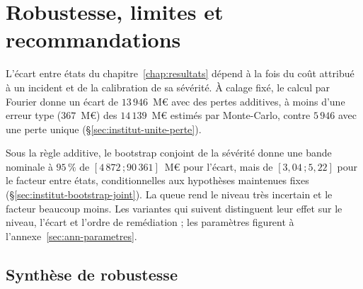 ﻿%

\chapter{Robustesse, limites et recommandations}
\label{ch:robustesse}
\label{part:limites}

L'écart entre états du chapitre~\ref{chap:resultats} dépend à la fois du coût attribué à un incident
et de la calibration de sa sévérité. À calage fixé, le calcul par Fourier donne un écart de
$13\,946$~M\euro{} avec des pertes additives, à moins d'une erreur type ($367$~M\euro) des
$14\,139$~M\euro{} estimés par Monte-Carlo, contre $5\,946$ avec une perte unique
(\S\ref{sec:institut-unite-perte}).

Sous la règle additive, le bootstrap conjoint de la sévérité
donne une bande nominale à $95\,\%$ de $[4\,872\,;90\,361]$~M\euro{} pour l'écart, mais de
$[3{,}04\,;5{,}22]$ pour le facteur entre états, conditionnelles aux hypothèses maintenues fixes
(\S\ref{sec:institut-bootstrap-joint}). La queue rend le niveau très incertain et le facteur
beaucoup moins. Les variantes qui suivent distinguent leur effet sur le niveau, l'écart et l'ordre
de remédiation ; les paramètres figurent à l'annexe~\ref{sec:ann-parametres}.

\section{Synthèse de robustesse}

